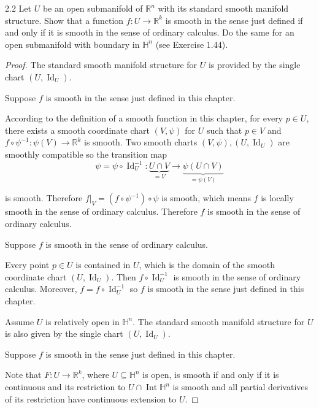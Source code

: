 \begin{exercise}{2.2}
    Let \( U \) be an open submanifold of \( \mathbb{R}^{n} \) with its standard smooth manifold structure. Show that a function \( f: U \to \mathbb{R}^{k} \) is smooth in the sense just defined if and only if it is smooth in the sense of ordinary calculus. Do the same for an open submanifold with boundary in \( \mathbb{H}^{n} \) (see Exercise 1.44).
\end{exercise}

\begin{proof}
    The standard smooth manifold structure for \( U \) is provided by the single chart \( (U, \operatorname{Id}_{U}) \).

    Suppose \( f \) is smooth in the sense just defined in this chapter.

    According to the definition of a smooth function in this chapter, for every \( p \in U \), there exists a smooth coordinate chart \( (V, \psi) \) for \( U \) such that \( p \in V \) and \( f \circ \psi^{-1}: \psi(V) \to \mathbb{R}^{k} \) is smooth. Two smooth charts \( (V, \psi), (U, \operatorname{Id}_{U}) \) are smoothly compatible so the transition map
    \[
        \psi = \psi \circ \operatorname{Id}_{U}^{-1}: \underbrace{U \cap V}_{= V} \to \underbrace{\psi(U \cap V)}_{= \psi(V)}
    \]

    is smooth. Therefore \( f\vert_{V} = (f \circ \psi^{-1}) \circ \psi \) is smooth, which means \( f \) is locally smooth in the sense of ordinary calculus. Therefore \( f \) is smooth in the sense of ordinary calculus.

    Suppose \( f \) is smooth in the sense of ordinary calculus.

    Every point \( p \in U \) is contained in \( U \), which is the domain of the smooth coordinate chart \( (U, \operatorname{Id}_{U}) \). Then \( f \circ \operatorname{Id}_{U}^{-1} \) is smooth in the sense of ordinary calculus. Moreover, \( f = f \circ \operatorname{Id}_{U}^{-1} \) so \( f \) is smooth in the sense just defined in this chapter.

    \bigskip

    Assume \( U \) is relatively open in \( \mathbb{H}^{n} \). The standard smooth manifold structure for \( U \) is also given by the single chart \( (U, \operatorname{Id}_{U}) \).

    Suppose \( f \) is smooth in the sense just defined in this chapter.

    Note that \( F: U \to \mathbb{R}^{k} \), where \( U \subseteq \mathbb{H}^{n} \) is open, is smooth if and only if it is continuous and its restriction to \( U \cap \operatorname{Int} \mathbb{H}^{n} \) is smooth and all partial derivatives of its restriction have continuous extension to \( U \).


\end{proof}

